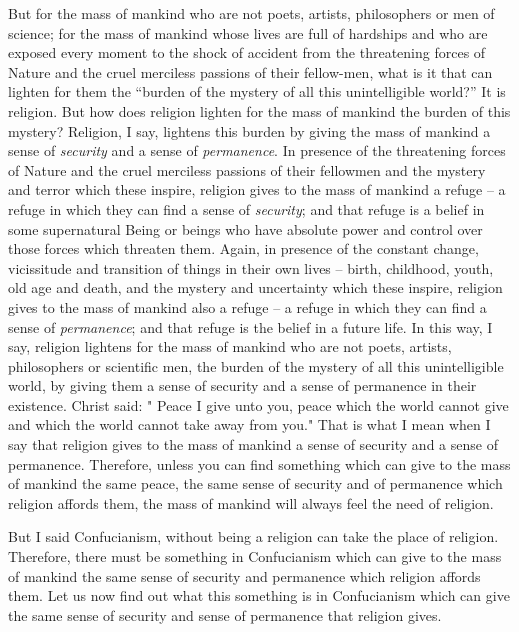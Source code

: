 But for the mass of mankind who are not poets, artists, philosophers or men of science; for the mass of mankind whose lives are full of hardships and who are exposed every moment to the shock of accident from the threatening forces of Nature and the cruel merciless passions of their fellow-men, what is it that can lighten for them the
``burden of the mystery of all this unintelligible world?''
It is religion. But how does religion lighten for the mass of mankind the burden of this mystery? Religion, I say, lightens this burden by giving the mass of mankind a sense of \emph{security} and a sense of \emph{permanence}. In presence of the threatening forces of Nature and the cruel merciless passions of their fellowmen and the mystery and terror which these inspire, religion gives to the mass of mankind a refuge -- a refuge in which they can find a sense of \emph{security}; and that refuge is a belief in some supernatural Being or beings who have absolute power and control over those forces which threaten them. Again, in presence of the constant change, vicissitude and transition of things in their own lives -- birth, childhood, youth, old age and death, and the mystery and uncertainty which these inspire, religion gives to the mass of mankind also a refuge -- a refuge in which they can find a sense of \emph{permanence}; and that refuge is the belief in a future life. In this way, I say, religion lightens for the mass of mankind who are not poets, artists, philosophers or scientific men, the burden of the mystery of all this unintelligible world, by giving them a sense of security and a sense of permanence in their existence. Christ said: " Peace I give unto you, peace which the world cannot give and which the world cannot take away from you." That is what I mean when I say that religion gives to the mass of mankind a sense of security and a sense of permanence. Therefore, unless you can find something which can give to the mass of mankind the same peace, the same sense of security and of permanence which religion affords them, the mass of mankind will always feel the need of religion.

But I said Confucianism, without being a religion can take the place of religion. Therefore, there must be something in Confucianism which can give to the mass of mankind the same sense of security and permanence which religion affords them. Let us now find out what this something is in Confucianism which can give the same sense of security and sense of permanence that religion gives.

